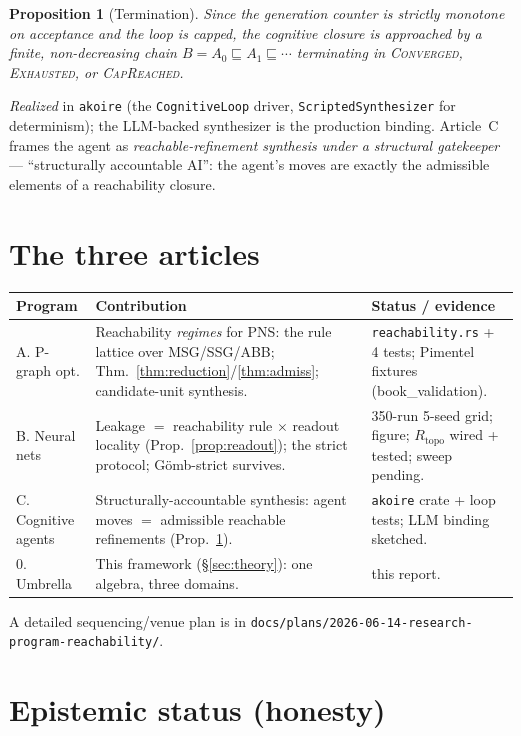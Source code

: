 \documentclass[11pt,a4paper]{article}
\theoremstyle{definition}
\theoremstyle{plain}
\newtheorem{proposition}{Proposition}
\theoremstyle{remark}
\newcommand{\Rtopo}{R_{\mathrm{topo}}}
\begin{document}
\begin{proposition}[Termination]
\label{prop:term}
Since the generation counter is strictly monotone on acceptance and the loop is
capped, the cognitive closure is approached by a finite, non-decreasing chain
$B=A_0\sqsubseteq A_1\sqsubseteq\cdots$ terminating in
\textsc{Converged}, \textsc{Exhausted}, or \textsc{CapReached}.
\end{proposition}
\emph{Realized} in \texttt{akoire} (the \texttt{CognitiveLoop} driver,
\texttt{ScriptedSynthesizer} for determinism); the LLM-backed synthesizer is the
production binding. Article~C frames the agent as \emph{reachable-refinement
synthesis under a structural gatekeeper} --- ``structurally accountable AI'': the
agent's moves are exactly the admissible elements of a reachability closure.

\section{The three articles}
\label{sec:articles}

\begin{tabular}{p{2.6cm}p{6.2cm}p{4.6cm}}
\toprule
Program & Contribution & Status / evidence \\
\midrule
A. P-graph opt. & Reachability \emph{regimes} for PNS: the rule lattice over
MSG/SSG/ABB; Thm.\ \ref{thm:reduction}/\ref{thm:admiss}; candidate-unit synthesis.
& \texttt{reachability.rs} + 4 tests; Pimentel fixtures (book\_validation). \\
B. Neural nets & Leakage $=$ reachability rule $\times$ readout locality
(Prop.\ \ref{prop:readout}); the strict protocol; Gömb-strict survives.
& 350-run 5-seed grid; figure; $\Rtopo$ wired + tested; sweep pending. \\
C. Cognitive agents & Structurally-accountable synthesis: agent moves $=$
admissible reachable refinements (Prop.\ \ref{prop:term}).
& \texttt{akoire} crate + loop tests; LLM binding sketched. \\
\midrule
0. Umbrella & This framework (\S\ref{sec:theory}): one algebra, three domains.
& this report. \\
\bottomrule
\end{tabular}

A detailed sequencing/venue plan is in
\texttt{docs/plans/2026-06-14-research-program-reachability/}.

\section{Epistemic status (honesty)}
\label{sec:status}
\end{document}
